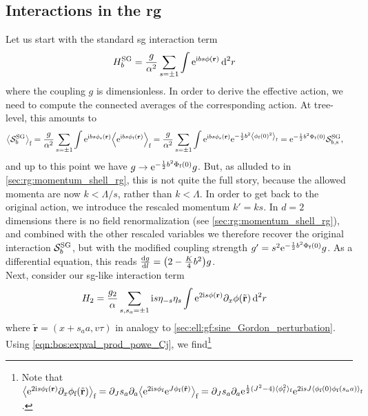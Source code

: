 \subsection{Interactions in the \tms{} \texorpdfstring{\acrshort{rg}}{RG}}\label{sec:ell:rg:msrg_interactions}
Let us start with the standard \gls{sg} interaction term
\begin{align*}
H_b^\tsg &= \frac{g}{\alpha^2} \sum_{s=\pm 1} \int \powe{\i bs\phi(\textbf{r})}\,\d^2r
\end{align*}
where the coupling $g$ is dimensionless.
In order to derive the effective action, we need to compute the connected averages of the corresponding action.
At tree-level, this amounts to
\begin{align*}
\bra[\big]{\sact_b^\tsg}_\f &= \frac{g}{\alpha^2} \sum_{s=\pm 1} \int \powe{\i bs \phi_\s(\textbf{r})} \bra*{\powe{\i bs \phi_\f(\textbf{r})}}_\f = \frac{g}{\alpha^2} \sum_{s=\pm 1} \int \powe{\i bs \phi_\s(\textbf{r})} \powe{-\frac{1}{2}b^2 \bra*{\phi_\f(0)^2}_\f} = \powe{-\frac{1}{2} b^2 \Phi_\f(0)} \sact_{b,\s}^\tsg,
\end{align*}
and up to this point we have $g\rightarrow \powe{-\frac{1}{2} b^2\Phi_\f(0)} g$.
But, as alluded to in \autoref{sec:rg:momentum_shell_rg}, this is not quite the full story, because the allowed momenta are now $k < \Lambda /s$, rather than $k< \Lambda$.
In order to get back to the original action, we introduce the rescaled momentum $k'=ks$.
In $d=2$ dimensions there is no field renormalization (see \autoref{sec:rg:momentum_shell_rg}), and
combined with the other rescaled variables we therefore recover the original interaction $\sact_b^\tsg$, but with the modified coupling strength $g' = s^2\powe{-\frac{1}{2}b^2 \Phi_\f(0)} g$.
As a differential equation, this reads $\frac{\d g}{\d l} = \kla*{2 - \frac{K}{4} b^2} g$.\\
Next, consider our \gls{sg}-like interaction term
\begin{align*}
H_2 &= \frac{g_2}{\alpha} \sum_{s,s_a=\pm 1} \i s \eta_{-s}\eta_s \int \powe{2\i s\phi(\textbf{r})}\partial_x\phi(\tilde{\textbf{r}}) \,\d^2r
\end{align*}
where $\tilde{\textbf{r}} = (x+s_aa,v\tau)$ in analogy to \autoref{sec:ell:gf:sine_Gordon_perturbation}.
Using \autoref{eqn:bos:expval_prod_powe_Cj}, we find\footnote{Note that $\bra[\big]{\powe{2\i s\phi_\f(\textbf{r})} \partial_x \phi_\f(\tilde{\textbf{r}})}_\f = \partial_J s_a\partial_a \bra[\big]{\powe{2\i s\phi_\f} \powe{J\phi_\f(\tilde{\textbf{r}})}}_\f = \partial_J s_a\partial_a \powe{\frac{1}{2} \kla{J^2 - 4} \bra{\phi_\f^2}_\f} \powe{2\i sJ \bra*{\phi_\f(0) \phi_\f(s_aa)}_\f}$.}
